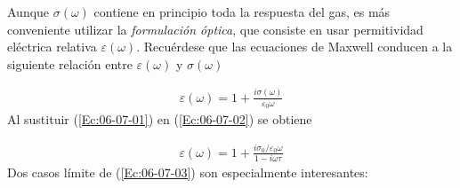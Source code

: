 Aunque $\sigma (\omega)$ contiene en principio toda la respuesta del gas, es más conveniente utilizar la \textit{formulación óptica}, que consiste en usar permitividad eléctrica relativa $\varepsilon(\omega)$. Recuérdese que las ecuaciones de Maxwell conducen a la siguiente relación entre $\varepsilon (\omega)$ y $\sigma (\omega)$ 
 
\begin{eqnarray}
	\varepsilon (\omega) = 1 + \frac{i \sigma(\omega)}{\varepsilon_0 \omega} \label{Ec:06-07-02}
\end{eqnarray}
Al sustituir (\ref{Ec:06-07-01}) en (\ref{Ec:06-07-02}) se obtiene 

\begin{eqnarray}
	\varepsilon(\omega) = 1 + \frac{i \sigma_0 / \varepsilon_0 \omega}{1-i\omega \tau} \label{Ec:06-07-03}
\end{eqnarray}
Dos casos límite de (\ref{Ec:06-07-03}) son especialmente interesantes:

